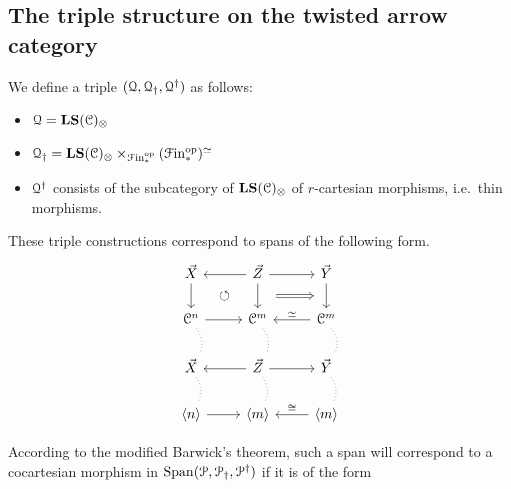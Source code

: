 \documentclass[main.tex]{subfiles}
\begin{document}
\subsection{The triple structure on the twisted arrow category}
\label{ssc:the_triple_structure_on_the_twisted_arrow_category}

We define a triple $(\mathcal{Q}, \mathcal{Q}_{\dagger}, \mathcal{Q}^{\dagger})$ as follows:
\begin{itemize}
  \item $\mathcal{Q} = \mathbf{LS}(\mathcal{C})_{\otimes}$

  \item $\mathcal{Q}_{\dagger} = \mathbf{LS}(\mathcal{C})_{\otimes} \times_{\mathcal{F}\mathrm{in}_{*}^{\mathrm{op}}}(\mathcal{F}\mathrm{in}_{*}^{\mathrm{op}})^{\simeq}$

  \item $\mathcal{Q}^{\dagger}$ consists of the subcategory of $\mathbf{LS}(\mathcal{C})_{\otimes}$ of $r$-cartesian morphisms, i.e.\ thin morphisms.
\end{itemize}

These triple constructions correspond to spans of the following form.
\begin{equation*}
  \begin{tikzcd}
    \vec{X}
    \arrow[d, ""{name=L, right}]
    & \vec{Z}
    \arrow[d, ""{name=ML, left}, ""{name=MR, right}]
    \arrow[r]
    \arrow[l]
    & \vec{Y}
    \arrow[d, ""{name=R, right}]
    \\
    \category{C}^{n}
    \arrow[d, no head, dotted, bend left]
    \arrow[r]
    & \category{C}^{m}
    \arrow[d, no head, dotted, bend left]
    & \category{C}^{m}
    \arrow[l, swap, "\simeq"]
    \arrow[d, no head, dotted, bend left]
    \\
    \vec{X}
    \arrow[d, no head, dotted, bend left]
    & \vec{Z}
    \arrow[d, no head, dotted, bend left]
    \arrow[r]
    \arrow[l]
    & \vec{Y}
    \arrow[d, no head, dotted, bend left]
    \\
    \langle n \rangle
    \arrow[r]
    & \langle m \rangle
    & \langle m \rangle
    \arrow[l, swap, "\cong"]
    \arrow[from=ML, to=L, phantom, shorten=1.5ex, "\circlearrowleft"{description}]
    \arrow[from=MR, to=R, Rightarrow, shorten=2ex]
  \end{tikzcd}
\end{equation*}

According to the modified Barwick's theorem, such a span will correspond to a cocartesian morphism in $\mathrm{Span}(\mathcal{P}, \mathcal{P}_{\dagger}, \mathcal{P}^{\dagger})$ if it is of the form
\end{document}
